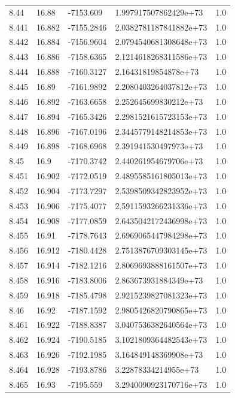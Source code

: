 \begin{tabular}{lllll}
8.44 & 16.88 & -7153.609 & 1.997917507862429e+73 & 1.0 \\
8.441 & 16.882 & -7155.2846 & 2.0382781187841882e+73 & 1.0 \\
8.442 & 16.884 & -7156.9604 & 2.0794540681308648e+73 & 1.0 \\
8.443 & 16.886 & -7158.6365 & 2.1214618268311586e+73 & 1.0 \\
8.444 & 16.888 & -7160.3127 & 2.16431819854878e+73 & 1.0 \\
8.445 & 16.89 & -7161.9892 & 2.2080403264037812e+73 & 1.0 \\
8.446 & 16.892 & -7163.6658 & 2.252645699830212e+73 & 1.0 \\
8.447 & 16.894 & -7165.3426 & 2.2981521615723153e+73 & 1.0 \\
8.448 & 16.896 & -7167.0196 & 2.3445779148214853e+73 & 1.0 \\
8.449 & 16.898 & -7168.6968 & 2.391941530497973e+73 & 1.0 \\
8.45 & 16.9 & -7170.3742 & 2.440261954679706e+73 & 1.0 \\
8.451 & 16.902 & -7172.0519 & 2.4895585161805013e+73 & 1.0 \\
8.452 & 16.904 & -7173.7297 & 2.5398509342823952e+73 & 1.0 \\
8.453 & 16.906 & -7175.4077 & 2.5911593266231336e+73 & 1.0 \\
8.454 & 16.908 & -7177.0859 & 2.6435042172436998e+73 & 1.0 \\
8.455 & 16.91 & -7178.7643 & 2.6969065447984298e+73 & 1.0 \\
8.456 & 16.912 & -7180.4428 & 2.7513876709303145e+73 & 1.0 \\
8.457 & 16.914 & -7182.1216 & 2.8069693888161507e+73 & 1.0 \\
8.458 & 16.916 & -7183.8006 & 2.863673931884349e+73 & 1.0 \\
8.459 & 16.918 & -7185.4798 & 2.9215239827081323e+73 & 1.0 \\
8.46 & 16.92 & -7187.1592 & 2.9805426820790865e+73 & 1.0 \\
8.461 & 16.922 & -7188.8387 & 3.0407536382640564e+73 & 1.0 \\
8.462 & 16.924 & -7190.5185 & 3.1021809364482543e+73 & 1.0 \\
8.463 & 16.926 & -7192.1985 & 3.164849148369908e+73 & 1.0 \\
8.464 & 16.928 & -7193.8786 & 3.22878334214955e+73 & 1.0 \\
8.465 & 16.93 & -7195.559 & 3.2940090923170716e+73 & 1.0 \\

\end{tabular}
